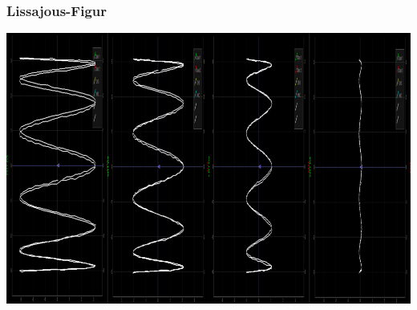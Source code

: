 %
%
%
\begin{frame}
\frametitle{Lissajous-Figur}
\begin{center}
\includegraphics[width=0.8\hsize]{../../buch/chapters/30-interpolation/figures/lissajous.png}
\end{center}
\end{frame}
